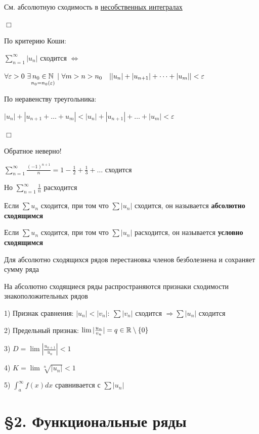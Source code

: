 \documentclass[12pt]{article}
\begin{document}
    \Mems См. абсолютную сходимость в \href{https://pelmesh619.github.io/itmo_conspects/conspects/calculus/calculus_superconspect.pdf}{несобственных интегралах}

    \begin{MyProof}
        $\Box$

        По критерию Коши:

        $\sum_{n = 1}^\infty |u_n|$ сходится $\Longleftrightarrow$

        $\forall \varepsilon > 0 \ \exists \underset{n_0 = n_0(\varepsilon)}{n_0 \in \mathbb{N}} \ | \ \forall m > n > n_0 \quad ||u_n| + |u_{n + 1}| + \dots + |u_m|| < \varepsilon$

        По неравенству треугольника:

        $|u_n| + |u_{n + 1} + \dots + u_m| < |u_n| + |u_{n + 1}| + \dots + |u_m| < \varepsilon$

        $\Box$
    \end{MyProof}

    \Notas Обратное неверно!

    \Ex $\sum_{n = 1}^\infty \frac{(-1)^{n + 1}}{n} = 1 - \frac{1}{2} + \frac{1}{3} + \dots $ сходится

    Но $\sum_{n = 1}^\infty \frac{1}{n}$ расходится

    \Def Если $\sum u_n$ сходится, при том что $\sum |u_n|$ сходится, он называется \textbf{абсолютно сходящимся}

    \Defs Если $\sum u_n$ сходится, при том что $\sum |u_n|$ расходится, он называется \textbf{условно сходящимся}

    \Notas Для абсолютно сходящихся рядов перестановка членов безболезнена и сохраняет сумму ряда

    \Notas На абсолютно сходящиеся ряды распространяются признаки сходимости знакоположительных рядов

    1) Признак сравнения: $|u_n| < |v_n|: \ \sum |v_n|$ сходится $\Longrightarrow \sum |u_n|$ сходится

    2) Предельный признак: $\lim |\frac{u_n}{v_n}| = q \in \mathbb{R} \setminus \{0\}$

    3) $D = \lim |\frac{u_{n + 1}}{u_n}| < 1$

    4) $K = \lim \sqrt[n]{|{u_n}|} < 1$

    5) $\int_a^\infty f(x)dx$ сравнивается с $\sum |u_n|$

    \clearpage


    \section{\S 2. Функциональные ряды}
\end{document}
